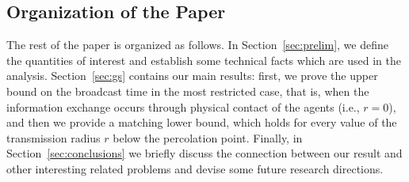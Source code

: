 \documentclass[11pt]{article}
\begin{document}
\subsection{Organization of the Paper}
The rest of the paper is organized as follows.  In
Section~\ref{sec:prelim}, we define the quantities of interest and
establish some technical facts which are used in the analysis.
Section~\ref{sec:gs} contains our main results: first, we prove the
upper bound on the broadcast time in the most restricted case, that
is, when the information exchange occurs through physical contact of
the agents (i.e., $r=0$), and then we provide a matching lower bound,
which holds for every value of the transmission radius $r$ below the
percolation point.  Finally, in Section~\ref{sec:conclusions} we
briefly discuss the connection between our result and other
interesting related problems and devise some future research directions.
\end{document}
